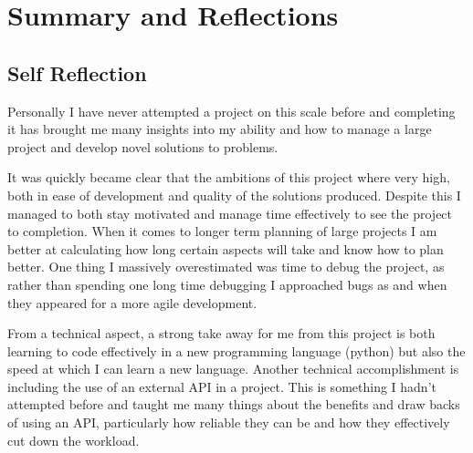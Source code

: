 \documentclass[a4paper]{article}
\begin{document}
\section{Summary and Reflections}
\subsection{Self Reflection}
\par
Personally I have never attempted a project on this scale before and completing it has brought me many insights into my ability and how to manage a large project and develop novel solutions to problems.
\par
It was quickly became clear that the ambitions of this project where very high, both in ease of development and quality of the solutions produced.
Despite this I managed to both stay motivated and manage time effectively to see the project to completion.
When it comes to longer term planning of large projects I am better at calculating how long certain aspects will take and know how to plan better.
One thing I massively overestimated was time to debug the project, as rather than spending one long time debugging I approached bugs as and when they appeared for a more agile development.
\par
From a technical aspect, a strong take away for me from this project is both learning to code effectively in a new programming language (python) but also the speed at which I can learn a new language.
Another technical accomplishment is including the use of an external API in a project.
This is something I hadn't attempted before and taught me many things about the benefits and draw backs of using an API, particularly how reliable they can be and how they effectively cut down the workload.
\end{document}

